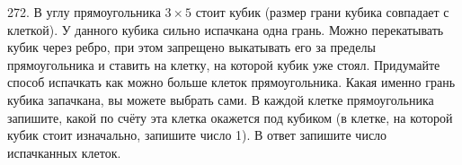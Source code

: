 272. В углу прямоугольника $3\times5$ стоит кубик (размер грани кубика совпадает с клеткой). У данного кубика сильно испачкана одна грань. Можно перекатывать кубик через ребро, при этом запрещено выкатывать его за пределы прямоугольника и ставить на клетку, на которой кубик уже стоял. Придумайте способ испачкать как можно больше клеток прямоугольника. Какая именно грань кубика запачкана, вы можете выбрать сами. В каждой клетке прямоугольника запишите, какой по счёту эта клетка окажется под кубиком (в клетке, на которой кубик стоит изначально, запишите число 1). В ответ запишите число испачканных клеток.
\begin{center}
\begin{figure}[ht!]
\end{figure}
\end{center}
